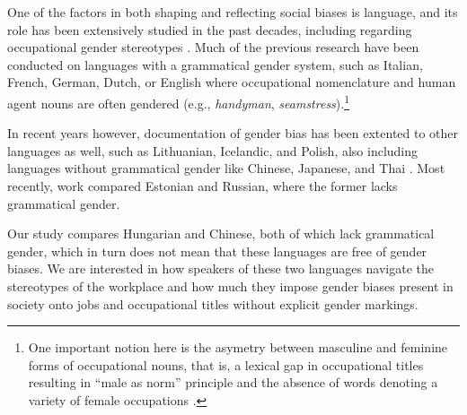 \documentclass[11pt]{article}
\begin{document}
One of the factors in both shaping and reflecting social biases is language, and its role has been extensively studied in the past decades, including regarding occupational gender stereotypes \citep[cf.][]{sabatini_1985_occupational,pauwels_1997_handymen,gygax_2008_generically,misersky_2014_norms,lewis_2020_gender,kaukonen_2025_gender}. Much of the previous research have been conducted on languages with a grammatical gender system, such as Italian, French, German, Dutch, or English where occupational nomenclature and human agent nouns are often gendered (e.g., \textit{handyman}, \textit{seamstress}).\footnote{One important notion here is the asymetry between masculine and feminine forms of occupational nouns, that is, a lexical gap in occupational titles resulting in ``male as norm'' principle and the absence of words denoting a variety of female occupations \citep{baron_1986_grammar,hellinger_1990_kontrastive,sabatini_1985_occupational,yaguello_1978_mots,pauwels_2003_linguistic,lassonde_2013_occupational}.} 



In recent years however, documentation of gender bias has been extented to other languages as well, such as Lithuanian, Icelandic, and Polish, also including languages without grammatical gender like Chinese, Japanese, and Thai \citep[][]{hellinger_2003_gender,pauwels_1998_women,pauwels_2003_linguistic}. Most recently,  work compared Estonian and Russian, where the former lacks grammatical gender.

Our study compares Hungarian and Chinese, both of which lack grammatical gender, which in turn does not mean that these languages are free of gender biases. We are interested in how speakers of these two languages navigate the stereotypes of the workplace and how much they impose gender biases present in society onto jobs and occupational titles without explicit gender markings.
\end{document}
